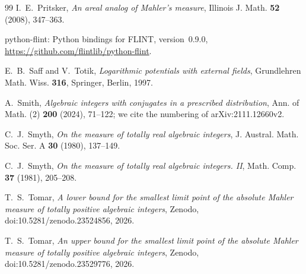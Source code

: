 \documentclass[11pt]{amsart}
\theoremstyle{remark}
\numberwithin{equation}{section}
\begin{document}
\begin{thebibliography}{99}
 I.~E.~Pritsker, \emph{An areal analog of Mahler's measure}, Illinois J. Math. \textbf{52} (2008), 347--363.

 python-flint: Python bindings for FLINT, version~0.9.0, \url{https://github.com/flintlib/python-flint}.

 E.~B.~Saff and V.~Totik, \emph{Logarithmic potentials with external fields}, Grundlehren Math. Wiss. \textbf{316}, Springer, Berlin, 1997.

 A.~Smith, \emph{Algebraic integers with conjugates in a prescribed distribution}, Ann. of Math. (2) \textbf{200} (2024), 71--122; we cite the numbering of arXiv:2111.12660v2.

 C.~J.~Smyth, \emph{On the measure of totally real algebraic integers}, J. Austral. Math. Soc. Ser. A \textbf{30} (1980), 137--149.

 C.~J.~Smyth, \emph{On the measure of totally real algebraic integers. II}, Math. Comp. \textbf{37} (1981), 205--208.

 T.~S.~Tomar, \emph{A lower bound for the smallest limit point of the absolute Mahler measure of totally positive algebraic integers}, Zenodo, doi:10.5281/zenodo.23524856, 2026.

 T.~S.~Tomar, \emph{An upper bound for the smallest limit point of the absolute Mahler measure of totally positive algebraic integers}, Zenodo, doi:10.5281/zenodo.23529776, 2026.

\end{thebibliography}
\end{document}

